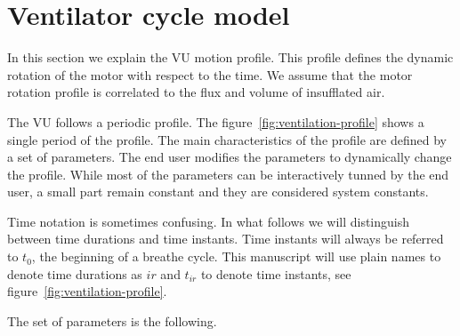 \documentclass[a4paper]{article}
\begin{document}
\section{Ventilator cycle model}
\label{sec:vent-cycle-model}

In this section we explain the VU motion profile. This profile defines
the dynamic rotation of the motor with respect to the time. We assume
that the motor rotation profile is correlated to the flux and volume of
insufflated air.

The VU follows a periodic profile. The
figure~\ref{fig:ventilation-profile} shows a single period of the
profile. The main characteristics of the profile are defined by a set
of parameters. The end user modifies the parameters to dynamically
change the profile. While most of the parameters can be interactively
tunned by the end user, a small part remain constant and they are
considered system constants.

Time notation is sometimes confusing. In what follows we will
distinguish between time durations and time instants. Time instants
will always be referred to $t_0$, the beginning of a breathe
cycle. This manuscript will use plain names to denote time durations
as $\mathit{ir}$ and $t_{\mathit{ir}}$ to denote time instants, see
figure~\ref{fig:ventilation-profile}.

The set of parameters is the following.
\end{document}
